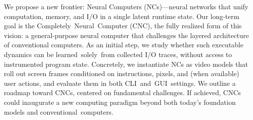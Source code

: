 


We propose a new frontier: Neural Computers (NCs)—neural networks that unify computation, memory, and I/O in a single latent runtime state.
Our long-term goal is the Completely~Neural~Computer (CNC), the fully realized form of this vision: a general-purpose neural computer that challenges the layered architecture of conventional computers.
As an initial step, we study whether such executable dynamics can be learned~solely~from collected I/O traces, without access to instrumented program state.
Concretely, we instantiate NCs as video models that roll out screen frames conditioned on instructions, pixels, and (when available) user actions, and evaluate them in both CLI~and~GUI~settings.
We outline a roadmap toward CNCs, centered on fundamental challenges. 
If achieved, CNCs could inaugurate a new computing paradigm beyond both today’s foundation models and conventional~computers.
